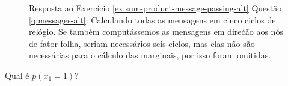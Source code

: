 \begin{exenumerate}
\begin{solution}
\begin{figure}[h]
\begin{center}
{}
            \end{center}
            \caption{\label{fig:all_messages-alt} Resposta ao Exerc\'icio \ref{ex:sum-product-message-passing-alt} Quest\~ao \ref{q:messages-alt}: Calculando todas as mensagens em cinco ciclos de rel\'ogio. Se tamb\'em comput\'assemos as mensagens em dire\'c\~ao aos n\'os de fator folha, seriam necess\'arios seis ciclos, mas elas n\~ao s\~ao necess\'arias para o c\'alculo das marginais, por isso foram omitidas.}
        \end{figure}
        
        
    \end{solution}
    
    \item Qual \'e $p(x_1=1)$?
    

\end{exenumerate}

